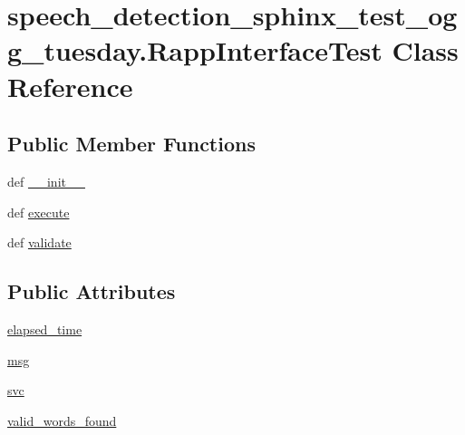 \hypertarget{classspeech__detection__sphinx__test__ogg__tuesday_1_1RappInterfaceTest}{\section{speech\-\_\-detection\-\_\-sphinx\-\_\-test\-\_\-ogg\-\_\-tuesday.\-Rapp\-Interface\-Test Class Reference}
\label{classspeech__detection__sphinx__test__ogg__tuesday_1_1RappInterfaceTest}
}
\subsection*{Public Member Functions}
\begin{DoxyCompactItemize}
\item 
def \hyperlink{classspeech__detection__sphinx__test__ogg__tuesday_1_1RappInterfaceTest_aab138934aba736a5fee49f225a60c250}{\-\_\-\-\_\-init\-\_\-\-\_\-}
\item 
def \hyperlink{classspeech__detection__sphinx__test__ogg__tuesday_1_1RappInterfaceTest_a3b7df600254601fc275cd7daba8ae461}{execute}
\item 
def \hyperlink{classspeech__detection__sphinx__test__ogg__tuesday_1_1RappInterfaceTest_a43af2e6d9bf897d12f7faf9a590b60e7}{validate}
\end{DoxyCompactItemize}
\subsection*{Public Attributes}
\begin{DoxyCompactItemize}
\item 
\hyperlink{classspeech__detection__sphinx__test__ogg__tuesday_1_1RappInterfaceTest_a7489f4e4554c48afd803a3cee91c96af}{elapsed\-\_\-time}
\item 
\hyperlink{classspeech__detection__sphinx__test__ogg__tuesday_1_1RappInterfaceTest_ae1d9f478acb47d2fdfbd0ccfb475d7b4}{msg}
\item 
\hyperlink{classspeech__detection__sphinx__test__ogg__tuesday_1_1RappInterfaceTest_a4f078c965b812d31086c0f1d2e2c998f}{svc}
\item 
\hyperlink{classspeech__detection__sphinx__test__ogg__tuesday_1_1RappInterfaceTest_a15fe3dc88f2c454ab1da9cf27c3dbe11}{valid\-\_\-words\-\_\-found}
\end{DoxyCompactItemize}



